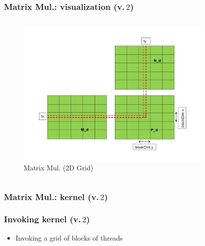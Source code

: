 \begin{frame}
	\frametitle{Matrix Mul.: visualization (v.\,$2$)}
      \begin{columns}
           \begin{figure}[H]
              \centering
              \includegraphics[width=0.85\textwidth]{./img/mulB.jpg}
		   \caption{\small{Matrix Mul. ($2$D Grid)}}
           \end{figure}
     \end{columns}
\end{frame}


\begin{frame}
        \frametitle{Matrix Mul.: kernel (v.\,$2$)}
        
\end{frame}

\begin{frame}
        \frametitle{Invoking kernel (v.\,$2$)}
        \begin{itemize}
                \item Invoking a grid of blocks of threads
        
        \end{itemize}
\end{frame}


